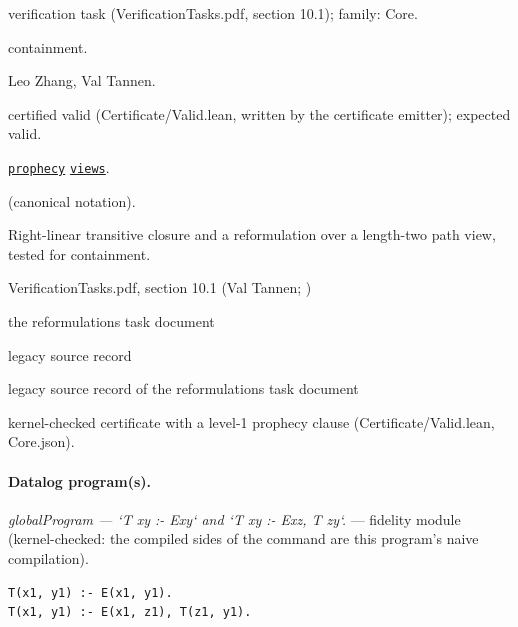 \documentclass[10pt]{article}
\begin{document}
\begin{description}[leftmargin=2.6cm,style=nextline,itemsep=1pt]

\item[Category] verification task (VerificationTasks.pdf, section 10.1); family: Core.

\item[Kind] containment.

\item[Contributors] Leo Zhang, Val Tannen.

\item[Status] certified valid (Certificate/Valid.lean, written by the certificate emitter); expected valid.

\item[Tags] \hyperref[tag:prophecy]{\texttt{prophecy}} \hyperref[tag:views]{\texttt{views}}.

\item[Input]  (canonical notation).

\item[Summary] Right-linear transitive closure and a reformulation over a length-two path view, tested for containment.

\item[Sources] {\raggedright VerificationTasks.pdf, section 10.1 (Val Tannen; ) \par the reformulations task document \par legacy source record  \par legacy source record of the reformulations task document\par}

\item[Prophecy] kernel-checked certificate with a level-1 prophecy clause (Certificate/Valid.lean, Core.json).

\end{description}

\paragraph{Datalog program(s).}

{\raggedright\textit{globalProgram --- `T xy :- Exy` and `T xy :- Exz, T zy`.} --- fidelity module (kernel-checked: the compiled sides of the command are this program's naive compilation).\par}

\begin{Verbatim}[fontsize=\scriptsize,breaklines=true,breakanywhere=true,frame=single,framesep=1.5mm]
T(x1, y1) :- E(x1, y1).
T(x1, y1) :- E(x1, z1), T(z1, y1).
\end{Verbatim}
\end{document}
